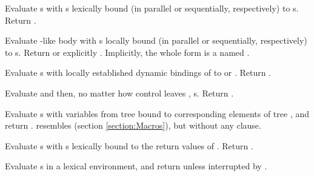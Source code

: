 \begin{LIST}{1cm}
  {
  Evaluate s with s lexically bound (in parallel or
  sequentially, respectively) to s. Return
  . 
  }

  {
  Evaluate -like body with s locally bound (in
  parallel or sequentially, respectively) to s. Return
  \retval{\NIL} or explicitly .
  Implicitly, the whole form is a  named \NIL. 
  }

  {
  Evaluate s with locally established dynamic bindings of
   to  or \NIL. Return . 
  }

  {
  Evaluate  and then, no matter how control leaves
  , s. Return . 
  }

  {
  Evaluate s with variables from tree  bound to
  corresponding elements of tree , and return .  resembles 
  (section \ref{section:Macros}), but without any 
  clause. 
  }

  {
  Evaluate
  s with s lexically bound to the return values of
  . Return .
  }

  { 
    Evaluate s in a lexical environment, and
    return  unless interrupted by
    . 
  }


\end{LIST}
